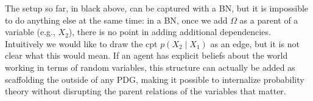 \documentclass{article}
\newcommand{\MN}{PDG}
\numberwithin{equation}{section}
\begin{document}
\begin{notfocus}
{\begin{example}
\begin{center}
{}
		\end{center}
		The setup so far, in black above, can be captured with
                a BN, but it is impossible to do anything else at the
                same time: in a BN, once we add $\Omega$ as a parent
                of a variable (e.g., $X_2$), there is no point in
                adding additional dependencies. Intuitively we would
                like to draw the cpt $p(X_2 \mid X_1)$ as an edge, but
                it is not clear what this would mean.		 
		If an agent has explicit beliefs about the world
                working in terms of random variables, this structure
                can actually be added as scaffolding the outside of
                any \MN, making it possible to internalize probability
                theory without disrupting the parent relations of the
                variables that matter. 
	\end{example}
}

\end{notfocus}
\end{document}
